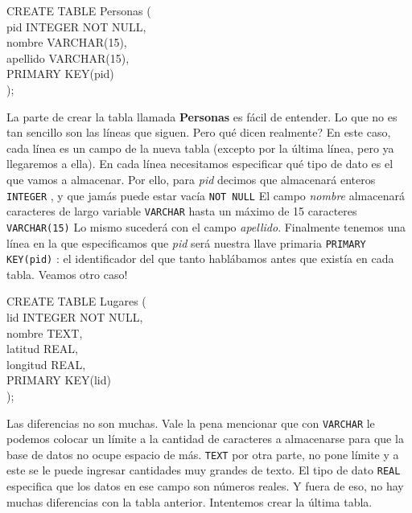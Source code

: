 \documentclass[10pt,letterpaper]{article}
\newcommand{\inlinecode}[1]{
\colorbox{light-gray}{\texttt{#1}}
}
\newenvironment{Code}
{
\begin{lrbox}{\selvestebox}%
\begin{minipage}{\dimexpr\columnwidth-2\fboxsep\relax}
\fontfamily{\ttdefault}\selectfont
}
{\end{minipage}\end{lrbox}%
\begin{center}
\colorbox{light-gray}{\usebox{\selvestebox}}
\end{center}
}
\begin{document}
\begin{Code}
CREATE TABLE Personas (\\
\hspace*{5mm}pid INTEGER NOT NULL,\\
\hspace*{5mm}nombre VARCHAR(15),\\
\hspace*{5mm}apellido VARCHAR(15),\\
\hspace*{5mm}PRIMARY KEY(pid)\\
);
\end{Code}

La parte de crear la tabla llamada \textbf{Personas} es f\'acil de entender. Lo que no es tan sencillo son las l\'ineas que siguen. Pero qu\'e dicen realmente? En este caso, cada l\'inea es un campo de la nueva tabla (excepto por la \'ultima l\'inea, pero ya llegaremos a ella). En cada l\'inea necesitamos especificar qu\'e tipo de dato es el que vamos a almacenar. Por ello, para \emph{pid} decimos que almacenar\'a enteros \inlinecode{INTEGER}, y que jam\'as puede estar vac\'ia \inlinecode{NOT NULL} El campo \emph{nombre} almacenar\'a caracteres de largo variable \inlinecode{VARCHAR} hasta un m\'aximo de 15 caracteres \inlinecode{VARCHAR(15)} Lo mismo suceder\'a con el campo \emph{apellido}. Finalmente tenemos una l\'inea en la que especificamos que \emph{pid} ser\'a nuestra llave primaria \inlinecode{PRIMARY KEY(pid)}: el identificador del que tanto habl\'abamos antes que exist\'ia en cada tabla. Veamos otro caso!

\begin{Code}
CREATE TABLE Lugares (\\
\hspace*{5mm}lid INTEGER NOT NULL,\\
\hspace*{5mm}nombre TEXT,\\
\hspace*{5mm}latitud REAL,\\
\hspace*{5mm}longitud REAL,\\
\hspace*{5mm}PRIMARY KEY(lid)\\
);
\end{Code}

Las diferencias no son muchas. Vale la pena mencionar que con \inlinecode{VARCHAR} le podemos colocar un l\'imite a la cantidad de caracteres a almacenarse para que la base de datos no ocupe espacio de m\'as. \inlinecode{TEXT} por otra parte, no pone l\'imite y a este se le puede ingresar cantidades muy grandes de texto. El tipo de dato \inlinecode{REAL} especifica que los datos en ese campo son n\'umeros reales. Y fuera de eso, no hay muchas diferencias con la tabla anterior. Intentemos crear la \'ultima tabla.\\
\end{document}
